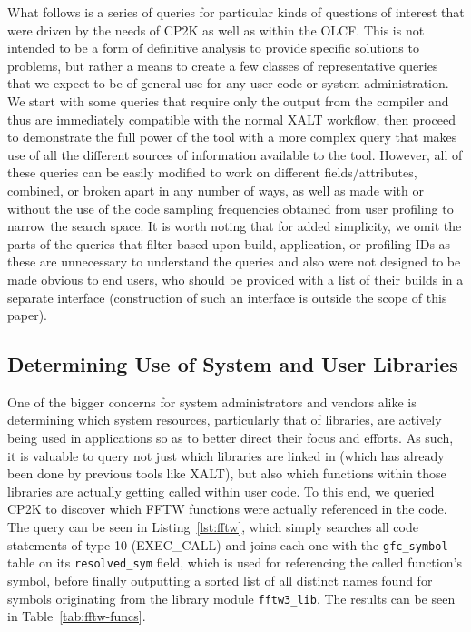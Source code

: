 What follows is a series of queries for particular kinds of questions of interest that were driven by the needs of CP2K as well as within the \acs{OLCF}.
This is not intended to be a form of definitive analysis to provide specific solutions to problems, but rather a means to create a few classes of representative queries that we expect to be of general use for any user code or system administration.
We start with some queries that require only the output from the compiler and thus are immediately compatible with the normal XALT workflow, then proceed to demonstrate the full power of the tool with a more complex query that makes use of all the different sources of information available to the tool.
However, all of these queries can be easily modified to work on different fields/attributes, combined, or broken apart in any number of ways, as well as made with or without the use of the code sampling frequencies obtained from user profiling to narrow the search space.
It is worth noting that for added simplicity, we omit the parts of the queries that filter based upon build, application, or profiling IDs as these are unnecessary to understand the queries and also were not designed to be made obvious to end users, who should be provided with a list of their builds in a separate interface (construction of such an interface is outside the scope of this paper).

\subsection{Determining Use of System and User Libraries}
One of the bigger concerns for system administrators and vendors alike is determining which system resources, particularly that of libraries, are actively being used in applications so as to better direct their focus and efforts.
As such, it is valuable to query not just which libraries are linked in (which has already been done by previous tools like XALT), but also which functions within those libraries are actually getting called within user code.
To this end, we queried CP2K to discover which \ac{FFTW} functions were actually referenced in the code.
The query can be seen in Listing~\ref{lst:fftw}, which simply searches all code statements of type 10 (EXEC\_CALL) and joins each one with the \texttt{gfc\_symbol} table on its \texttt{resolved\_sym} field, which is used for referencing the called function's symbol, before finally outputting a sorted list of all distinct names found for symbols originating from the library module \texttt{fftw3\_lib}.
The results can be seen in Table~\ref{tab:fftw-funcs}.

